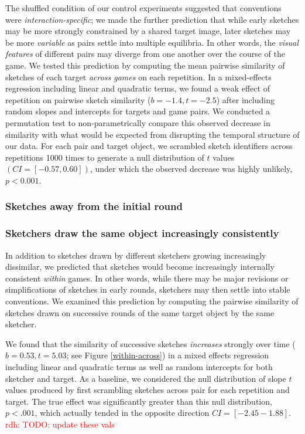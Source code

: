 \documentclass[10pt,letterpaper]{article}
\newcommand{\rdh}[1]{\textcolor{Red}{rdh: #1}}
\begin{document}
The shuffled condition of our control experiments suggested that conventions were \emph{interaction-specific}; we made the further prediction that while early sketches may be more strongly constrained by a shared target image, later sketches may be more \emph{variable} as pairs settle into multiple equilibria.
In other words, the \emph{visual features} of different pairs may diverge from one another over the course of the game.
We tested this prediction by computing the mean pairwise similarity of sketches of each target \emph{across games} on each repetition. 
In a mixed-effects regression including linear and quadratic terms, we found a weak effect of repetition on pairwise sketch similarity ($b = -1.4, t = -2.5$)  after including random slopes and intercepts for targets and game pairs. %
We conducted a permutation test to non-parametrically compare this observed decrease in similarity with what would be expected from disrupting the temporal structure of our data.
For each pair and target object, we scrambled sketch identifiers across repetitions 1000 times to generate a null distribution of $t$ values $(CI = [-0.57, 0.60])$, under which the observed decrease was highly unlikely, $p < 0.001$.

\subsubsection{Sketches  away from the initial round}

\subsubsection{Sketchers draw the same object increasingly consistently}

In addition to sketches drawn by different sketchers growing increasingly dissimilar, we predicted that sketches would become increasingly internally consistent \emph{within} games. 
In other words, while there may be major revisions or simplifications of sketches in early rounds, sketchers may then settle into stable conventions.
We examined this prediction by computing the pairwise similarity of sketches drawn on successive rounds of the same target object by the same sketcher. 

We found that the similarity of successive sketches \emph{increases} strongly over time ($b = 0.53, t = 5.03$; see Figure \ref{within-across}) in a mixed effects regression including linear and quadratic terms as well as random intercepts for both sketcher and target. 
As a baseline, we considered the null distribution of slope $t$ values produced by first scrambling sketches across pair for each repetition and target.
The true effect was significantly greater than this null distribution, $p < .001$, which actually tended in the opposite direction $CI = [-2.45 -1.88]$.  \rdh{TODO: update these vals}
\end{document}
